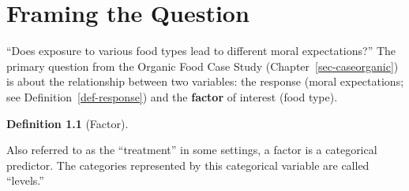 \documentclass[
  letterpaper,
  DIV=11,
  numbers=noendperiod]{scrreprt}
\theoremstyle{plain}
\theoremstyle{definition}
\theoremstyle{definition}
\newtheorem{definition}{Definition}[chapter]
\theoremstyle{remark}
\begin{document}
\begin{table}

\caption{\label{tbl-caseorganic-table}Subset of data from study
characterizing moral behavior following exposure to various food
categories.}


\end{table}%

\chapter{Framing the Question}\label{sec-anovaquestions}

``Does exposure to various food types lead to different moral
expectations?'' The primary question from the Organic Food Case Study
(Chapter~\ref{sec-caseorganic}) is about the relationship between two
variables: the response (moral expectations; see
Definition~\ref{def-response}) and the \textbf{factor} of interest (food
type).

\begin{definition}[Factor]\protect\hypertarget{def-factor}{}\label{def-factor}

Also referred to as the ``treatment'' in some settings, a factor is a
categorical predictor. The categories represented by this categorical
variable are called ``levels.''

\end{definition}
\end{document}
